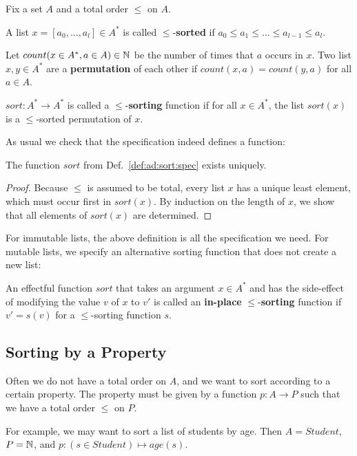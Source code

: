 \begin{definition}[Sorting]\label{def:ad:sort:spec}
Fix a set $A$ and a total order $\leq$ on $A$.

A list $x=[a_0,\ldots,a_l]\in A^*$ is called $\leq$-\textbf{sorted} if $a_0\leq a_1 \leq \ldots \leq a_{l-1}\leq a_l$.

Let $count(x\in A^*,a\in A)\in\mathbb{N}$ be the number of times that $a$ occurs in $x$.
Two list $x,y\in A^*$ are a \textbf{permutation} of each other if $count(x,a)=count(y,a)$ for all $a\in A$.

$sort:A^*\to A^*$ is called a $\leq$-\textbf{sorting} function if for all $x\in A^*$, the list $sort(x)$ is a $\leq$-sorted permutation of $x$.
\end{definition}

As usual we check that the specification indeed defines a function:

\begin{theorem}[Uniqueness]
The function $sort$ from Def.~\ref{def:ad:sort:spec} exists uniquely.
\end{theorem}
\begin{proof}
Because $\leq$ is assumed to be total, every list $x$ has a unique least element, which must occur first in $sort(x)$.
By induction on the length of $x$, we show that all elements of $sort(x)$ are determined.
\end{proof}

For immutable lists, the above definition is all the specification we need.
For mutable lists, we specify an alternative sorting function that does not create a new list:

\begin{definition}
An effectful function $sort$ that takes an argument $x\in A^*$ and has the side-effect of modifying the value $v$ of $x$ to $v'$ is called an \textbf{in-place} $\leq$-\textbf{sorting} function if $v'=s(v)$ for a $\leq$-sorting function $s$.
\end{definition}

\subsection{Sorting by a Property}\label{sec:ad:sort:stable}

Often we do not have a total order on $A$, and we want to sort according to a certain property.
The property must be given by a function $p:A\to P$ such that we have a total order $\leq$ on $P$.

For example, we may want to sort a list of students by age.
Then $A=Student$, $P=\mathbb{N}$, and $p:(s\in Student)\mapsto age(s)$.

